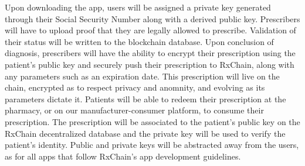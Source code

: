 Upon downloading the app, users will be assigned a private key generated through their Social Security Number
along with a derived public key.
Prescribers will have to upload proof that they are legally allowed to prescribe.
Validation of their status will be written to the blockchain database.
Upon conclusion of diagnosis, prescribers will have the ability to encrypt their prescription using the patient's public key
and securely push their prescription to RxChain, along with any parameters such as an expiration date.
This prescription will live on the chain, encrypted as to respect privacy and anomnity, and evolving as its parameters dictate it.
Patients will be able to redeem their prescription at the pharmacy, or on our manufacturer-consumer platform, to consume their prescription.
The prescription will be associated to the patient's public key on the RxChain decentralized database and the private key will be used to verify the patient's identity.
Public and private keys will be abstracted away from the users, as for all apps that follow RxChain's app development guidelines.
